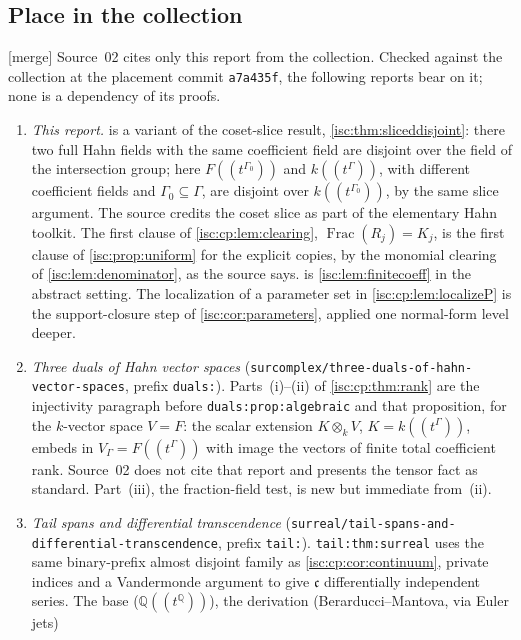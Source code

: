 \documentclass[11pt,letterpaper]{article}
\theoremstyle{definition}
\theoremstyle{remark}
\newcommand{\Q}{\mathbb Q}
\newcommand{\Frac}{\operatorname{Frac}}
\newcommand{\rpath}[1]{\nolinkurl{#1}}%
\newcommand{\lbl}[1]{\nolinkurl{#1}}%
\newcommand{\mtag}{\textup{[merge]}}%
\newcommand{\cc}{\mathfrak c}
\numberwithin{equation}{section}
\begin{document}
\subsection{Place in the collection}\label{isc:cp:sec:collection}

\mtag{} Source~02 cites only this report from the collection. Checked
against the collection at the placement commit \texttt{a7a435f}, the
following reports bear on it; none is a dependency of its proofs.
\begin{enumerate}[leftmargin=*,itemsep=3pt]
\item \emph{This report.}  is a variant of the
coset-slice result, \cref{isc:thm:sliceddisjoint}: there two full Hahn
fields with the same coefficient field are disjoint over the field of the
intersection group; here $F((t^{\Gamma_0}))$ and $k((t^\Gamma))$, with
different coefficient fields and $\Gamma_0\subseteq\Gamma$, are disjoint
over $k((t^{\Gamma_0}))$, by the same slice argument. The source credits
the coset slice as part of the elementary Hahn toolkit. The first clause
of \cref{isc:cp:lem:clearing}, $\Frac(R_j)=K_j$, is the first clause of
\cref{isc:prop:uniform} for the explicit copies, by the monomial clearing of
\cref{isc:lem:denominator}, as the source says.  is
\cref{isc:lem:finitecoeff} in the abstract setting. The localization of a
parameter set in \cref{isc:cp:lem:localizeP} is the support-closure step of
\cref{isc:cor:parameters}, applied one normal-form level deeper.
\item \emph{Three duals of Hahn vector spaces}
(\rpath{surcomplex/three-duals-of-hahn-vector-spaces}, prefix
\texttt{duals:}). Parts~(i)--(ii) of \cref{isc:cp:thm:rank} are the
injectivity paragraph before \lbl{duals:prop:algebraic} and that
proposition, for the $k$-vector space $V=F$: the scalar extension
$K\otimes_kV$, $K=k((t^\Gamma))$, embeds in $V_\Gamma=F((t^\Gamma))$ with
image the vectors of finite total coefficient rank. Source~02 does not cite
that report and presents the tensor fact as standard. Part~(iii), the
fraction-field test, is new but immediate from~(ii).
\item \emph{Tail spans and differential transcendence}
(\rpath{surreal/tail-spans-and-differential-transcendence}, prefix
\texttt{tail:}). \lbl{tail:thm:surreal} uses the same binary-prefix almost
disjoint family as \cref{isc:cp:cor:continuum}, private indices and a
Vandermonde argument to give $\cc$ differentially independent series. The
base ($\Q((t^\Q))$), the derivation (Berarducci--Mantova, via Euler jets)

\end{enumerate}
\end{document}
